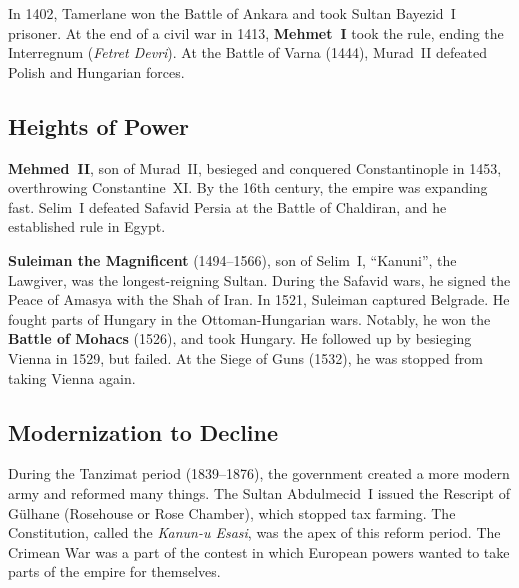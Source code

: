 In 1402, Tamerlane won the Battle of Ankara and took Sultan Bayezid~I prisoner.
At the end of a civil war in 1413, \textbf{Mehmet~I} took the rule, ending the Interregnum (\textit{Fetret Devri}).
At the Battle of Varna (1444), Murad~II defeated Polish and Hungarian forces.

\subsection*{Heights of Power}

\textbf{Mehmed~II}, son of Murad~II, besieged and conquered Constantinople in 1453, overthrowing Constantine~XI\@.
By the 16th century, the empire was expanding fast.
Selim~I defeated Safavid Persia at the Battle of Chaldiran, and he established rule in Egypt.

\textbf{Suleiman the Magnificent} (1494--1566), son of Selim~I, ``Kanuni'', the Lawgiver,
was the longest-reigning Sultan.
During the Safavid wars, he signed the Peace of Amasya with the Shah of Iran.
In 1521, Suleiman captured Belgrade.
He fought parts of Hungary in the Ottoman-Hungarian wars.
Notably, he won the \textbf{Battle of Mohacs} (1526), and took Hungary.
He followed up by besieging Vienna in 1529, but failed.
At the Siege of Guns (1532), he was stopped from taking Vienna again.

\subsection*{Modernization to Decline}

During the Tanzimat period (1839--1876), the government created a more modern army and reformed many things.
The Sultan Abdulmecid~I issued the Rescript of G\"ulhane (Rosehouse or Rose Chamber), which stopped tax farming.
The Constitution, called the \textit{Kanun-u Esasi}, was the apex of this reform period.
The Crimean War was a part of the contest in which European powers wanted to take parts of the empire for themselves.
